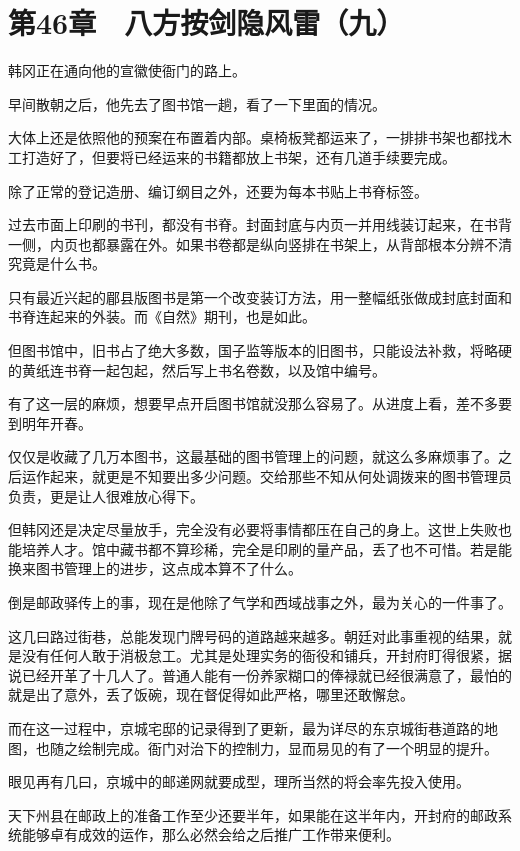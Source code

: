 \section{第46章　八方按剑隐风雷（九）}

韩冈正在通向他的宣徽使衙门的路上。

早间散朝之后，他先去了图书馆一趟，看了一下里面的情况。

大体上还是依照他的预案在布置着内部。桌椅板凳都运来了，一排排书架也都找木工打造好了，但要将已经运来的书籍都放上书架，还有几道手续要完成。

除了正常的登记造册、编订纲目之外，还要为每本书贴上书脊标签。

过去市面上印刷的书刊，都没有书脊。封面封底与内页一并用线装订起来，在书背一侧，内页也都暴露在外。如果书卷都是纵向竖排在书架上，从背部根本分辨不清究竟是什么书。

只有最近兴起的郿县版图书是第一个改变装订方法，用一整幅纸张做成封底封面和书脊连起来的外装。而《自然》期刊，也是如此。

但图书馆中，旧书占了绝大多数，国子监等版本的旧图书，只能设法补救，将略硬的黄纸连书脊一起包起，然后写上书名卷数，以及馆中编号。

有了这一层的麻烦，想要早点开启图书馆就没那么容易了。从进度上看，差不多要到明年开春。

仅仅是收藏了几万本图书，这最基础的图书管理上的问题，就这么多麻烦事了。之后运作起来，就更是不知要出多少问题。交给那些不知从何处调拨来的图书管理员负责，更是让人很难放心得下。

但韩冈还是决定尽量放手，完全没有必要将事情都压在自己的身上。这世上失败也能培养人才。馆中藏书都不算珍稀，完全是印刷的量产品，丢了也不可惜。若是能换来图书管理上的进步，这点成本算不了什么。

倒是邮政驿传上的事，现在是他除了气学和西域战事之外，最为关心的一件事了。

这几曰路过街巷，总能发现门牌号码的道路越来越多。朝廷对此事重视的结果，就是没有任何人敢于消极怠工。尤其是处理实务的衙役和铺兵，开封府盯得很紧，据说已经开革了十几人了。普通人能有一份养家糊口的俸禄就已经很满意了，最怕的就是出了意外，丢了饭碗，现在督促得如此严格，哪里还敢懈怠。

而在这一过程中，京城宅邸的记录得到了更新，最为详尽的东京城街巷道路的地图，也随之绘制完成。衙门对治下的控制力，显而易见的有了一个明显的提升。

眼见再有几曰，京城中的邮递网就要成型，理所当然的将会率先投入使用。

天下州县在邮政上的准备工作至少还要半年，如果能在这半年内，开封府的邮政系统能够卓有成效的运作，那么必然会给之后推广工作带来便利。

